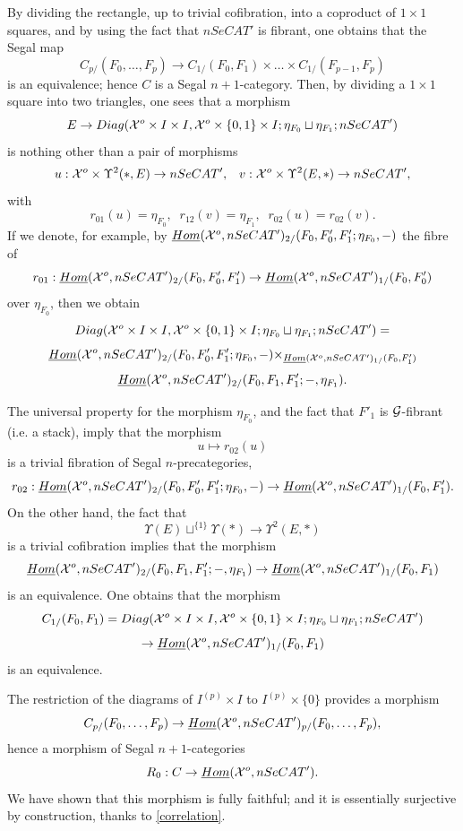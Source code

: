 By dividing the rectangle, up to trivial cofibration, into a coproduct of
$1\times 1$ squares, and by using the fact that
$nSeCAT'$
is fibrant, one obtains that the Segal map
$$
C_{p/}(F_0,\ldots , F_p)\rightarrow
C_{1/}(F_0,F_1)\times \ldots \times C_{1/}(F_{p-1}, F_p)
$$
is an equivalence; hence $C$ is a Segal $n+1$-category.
Then, by dividing a $1\times 1$ square into two triangles,
one sees that a morphism
$$
E\rightarrow Diag({\cal X} ^o\times I\times I,
{\cal X} ^o\times \{ 0,1\}\times I; \eta _{F_0}\sqcup \eta _{F_1};
nSeCAT')
$$
is nothing other than a pair of morphisms
$$
u: {\cal X} ^o\times \Upsilon ^2(\ast ,E)\rightarrow nSeCAT', \;\;\;
v: {\cal X} ^o\times \Upsilon  ^2(E,\ast )\rightarrow nSeCAT',
$$
with
$$
r_{01}(u)=\eta _{F_0},\;\; r_{12}(v)= \eta _{F_1}, \;\; r_{02}(u)=r_{02}(v).
$$
If we denote, for example, by $\underline{Hom}({\cal X} ^o,nSeCAT')_{2/}(F_0, F'_0, F'_1;
\eta _{F_0},-)$ the fibre of
$$
r_{01}:\underline{Hom}({\cal X} ^o,nSeCAT')_{2/}(F_0, F'_0, F'_1)\rightarrow
\underline{Hom}({\cal X} ^o,nSeCAT')_{1/}(F_0, F'_0)
$$
over $\eta _{F_0}$, then we obtain
$$
Diag({\cal X} ^o\times I\times I,
{\cal X} ^o\times \{ 0,1\}\times I; \eta _{F_0}\sqcup \eta _{F_1};
nSeCAT') =
$$
$$
\underline{Hom}({\cal X} ^o,nSeCAT')_{2/}(F_0, F'_0, F'_1; \eta _{F_0},-)\times _{
\underline{Hom}({\cal X} ^o,nSeCAT')_{1/}(F_0,  F'_1)}
$$
$$
\underline{Hom}({\cal X} ^o,nSeCAT')_{2/}(F_0, F_1, F'_1; -,\eta _{F_1}).
$$

The universal property for the morphism $\eta _{F_0}$, and the fact that
$F'_1$ is ${\cal G}$-fibrant (i.e. a stack), imply that
the morphism
$$
u\mapsto r_{02}(u)
$$
is a trivial fibration of Segal $n$-precategories,
$$
r_{02}: \underline{Hom}({\cal X} ^o,nSeCAT')_{2/}(F_0, F'_0, F'_1; \eta _{F_0},-)
\rightarrow \underline{Hom}({\cal X} ^o,nSeCAT')_{1/}(F_0,  F'_1).
$$
On the other hand, the fact that
$$
\Upsilon (E)\sqcup ^{\{ 1\} }\Upsilon (\ast )
\rightarrow \Upsilon ^2(E,\ast )
$$
is a trivial cofibration implies that the morphism
$$
\underline{Hom}({\cal X} ^o,nSeCAT')_{2/}(F_0, F_1, F'_1; -,\eta _{F_1})
\rightarrow
\underline{Hom}({\cal X} ^o,nSeCAT')_{1/}(F_0, F_1)
$$
is an equivalence. One obtains that the morphism
$$
C_{1/}(F_0,F_1)=
Diag({\cal X} ^o\times I\times I, {\cal X} ^o \times \{ 0,1\}\times I; \eta _{F_0}\sqcup
\eta _{F_1}; nSeCAT')
$$
$$
\rightarrow \underline{Hom}({\cal X} ^o,nSeCAT')_{1/}(F_0,F_1)
$$
is an equivalence.

The restriction of the diagrams of $I^{(p)}\times I$ to
$I^{(p)}\times \{ 0\}$ provides a morphism
$$
C_{p/}(F_0,\ldots , F_p)\rightarrow\underline{Hom}({\cal X}
^o,nSeCAT')_{p/}(F_0,\ldots , F_p),
$$
hence a morphism of Segal $n+1$-categories
$$
R_0: C\rightarrow \underline{Hom}({\cal X} ^o,nSeCAT').
$$
We have shown that this morphism is fully faithful;
and it is essentially surjective by construction, thanks to
\ref{correlation}.


